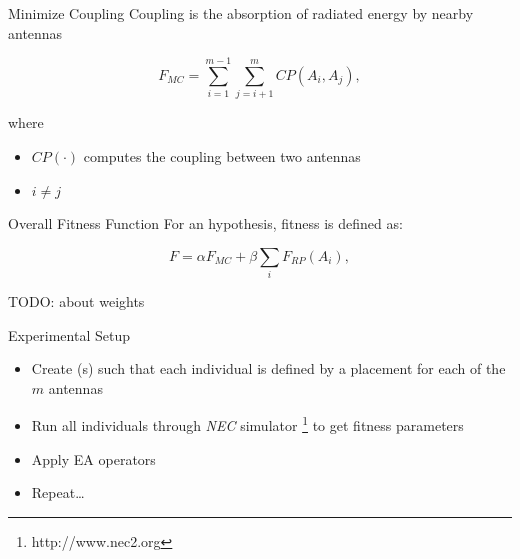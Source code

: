 \documentclass{beamer}
\begin{document}
        \begin{frame}{Minimize Coupling}
            Coupling is the absorption of radiated energy by nearby antennas
            \begin{tcolorbox}[colback=green!5]
                \begin{equation}
                    F_{MC} = \sum_{i=1}^{m-1}\sum_{j=i+1}^{m} CP(A_i, A_j),
                \end{equation}
            \end{tcolorbox}
            where
            \begin{itemize}
                \item $CP(\cdot)$ computes the coupling between two antennas
                \item $i \neq j$
            \end{itemize}
        \end{frame}


        \begin{frame}{Overall Fitness Function}
            For an hypothesis, fitness is defined as:
            \begin{tcolorbox}[colback=green!5]
                \begin{equation} \label{eq:optimal}
                    F = \alpha F_{MC} + \beta \sum_{i} F_{RP}(A_i),
                \end{equation}
            \end{tcolorbox}
            TODO: about weights
        \end{frame}


        \begin{frame}[t]{Experimental Setup}
            \begin{itemize}
                \item Create (s) such that each individual is defined by a placement for each of the $m$ antennas
                \item Run all individuals through \textit{NEC} simulator \footnote{http://www.nec2.org} to get fitness parameters 
                \item Apply EA operators 
                \item Repeat\dots 
            \end{itemize}
            \vspace{10mm}
        \end{frame}
\end{document}

